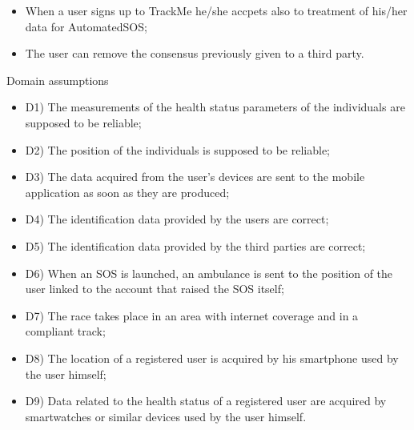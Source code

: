 \documentclass{article}
\begin{document}
\begin{legal}
\begin{legal}
\begin{legal}
{\begin{itemize}
					\item When a user signs up to TrackMe he/she accpets also to treatment of his/her data for AutomatedSOS;\\
					\item The user can remove the consensus previously given to a third party.\\
				\end{itemize}}
			\item Domain assumptions \\
			{\normalfont
				\begin{itemize}
				\item D1) The measurements of the health status parameters of the individuals are supposed to be reliable;\\
				\item D2) The position of the individuals is supposed to be reliable;\\
				\item D3) The data acquired from the user’s devices are sent to the mobile application as soon as they are produced;\\
				\item D4) The identification data provided by the users are correct;\\
				\item D5) The identification data provided by the third parties are correct;\\
				\item D6) When an SOS is launched, an ambulance is sent to the position of the user linked to the account that raised the SOS itself;\\
				\item D7) The race takes place in an area with internet coverage and in a compliant track;\\
				\item D8) The location of a registered user is acquired by his smartphone used by the user himself;\\
				\item D9) Data related to the health status of a registered user are acquired by smartwatches or similar devices used by the user himself.\\
				\end{itemize}
			}
			\end{legal}
		\end{legal}
	

\end{legal}
\end{document}
